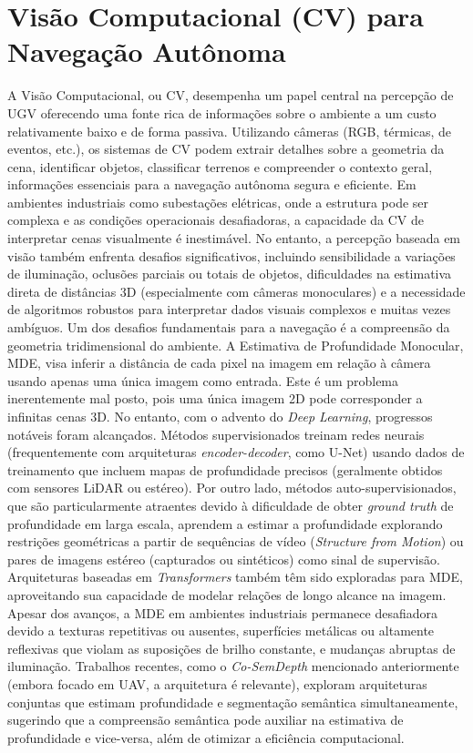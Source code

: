 \section{Visão Computacional (CV) para Navegação Autônoma}
A Visão Computacional, ou \ac{CV}, desempenha um papel central na percepção de \ac{UGV} oferecendo uma fonte rica de informações sobre o ambiente a um custo relativamente baixo e de forma passiva. Utilizando câmeras (RGB, térmicas, de eventos, etc.), os sistemas de \ac{CV} podem extrair detalhes sobre a geometria da cena, identificar objetos, classificar terrenos e compreender o contexto geral, informações essenciais para a navegação autônoma segura e eficiente. Em ambientes industriais como subestações elétricas, onde a estrutura pode ser complexa e as condições operacionais desafiadoras, a capacidade da \ac{CV} de interpretar cenas visualmente é inestimável. No entanto, a percepção baseada em visão também enfrenta desafios significativos, incluindo sensibilidade a variações de iluminação, oclusões parciais ou totais de objetos, dificuldades na estimativa direta de distâncias 3D (especialmente com câmeras monoculares) e a necessidade de algoritmos robustos para interpretar dados visuais complexos e muitas vezes ambíguos.
Um dos desafios fundamentais para a navegação é a compreensão da geometria tridimensional do ambiente. A Estimativa de Profundidade Monocular, \ac{MDE}, visa inferir a distância de cada pixel na imagem em relação à câmera usando apenas uma única imagem como entrada. Este é um problema inerentemente mal posto, pois uma única imagem 2D pode corresponder a infinitas cenas 3D. No entanto, com o advento do \textit{Deep Learning}, progressos notáveis foram alcançados. Métodos supervisionados treinam redes neurais (frequentemente com arquiteturas \textit{encoder-decoder}, como U-Net) usando dados de treinamento que incluem mapas de profundidade precisos (geralmente obtidos com sensores \ac{LiDAR} ou estéreo). Por outro lado, métodos auto-supervisionados, que são particularmente atraentes devido à dificuldade de obter \textit{ground truth} de profundidade em larga escala, aprendem a estimar a profundidade explorando restrições geométricas a partir de sequências de vídeo (\textit{Structure from Motion}) ou pares de imagens estéreo (capturados ou sintéticos) como sinal de supervisão. Arquiteturas baseadas em \textit{Transformers} também têm sido exploradas para \ac{MDE}, aproveitando sua capacidade de modelar relações de longo alcance na imagem. Apesar dos avanços, a \ac{MDE} em ambientes industriais permanece desafiadora devido a texturas repetitivas ou ausentes, superfícies metálicas ou altamente reflexivas que violam as suposições de brilho constante, e mudanças abruptas de iluminação. Trabalhos recentes, como o \textit{Co-SemDepth} mencionado anteriormente (embora focado em \ac{UAV}, a arquitetura é relevante), exploram arquiteturas conjuntas que estimam profundidade e segmentação semântica simultaneamente, sugerindo que a compreensão semântica pode auxiliar na estimativa de profundidade e vice-versa, além de otimizar a eficiência computacional.
